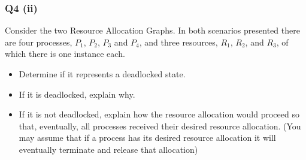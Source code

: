 \documentclass[a4paper, 10pt]{article}
\begin{document}
\subsubsection*{Q4 (ii)}
Consider the two Resource Allocation Graphs. In both scenarios presented there are four processes, $P_1$, $P_2$, $P_3$ and $P_4$, and three resources, $R_1$, $R_2$, and $R_3$, of which there is one instance each.
\begin{itemize}
    \item Determine if it represents a deadlocked state.
    \item If it is deadlocked, explain why.
    \item If it is not deadlocked, explain how the resource allocation would
          proceed so that, eventually, all processes received their desired
          resource allocation. (You may assume that if a process has its
          desired resource allocation it will eventually terminate and release
          that allocation)
\end{itemize}
\vskip0.5cm
\begin{minipage}{0.5\textwidth}
    \begin{center}
    \end{center}
\end{minipage}
\end{document}
